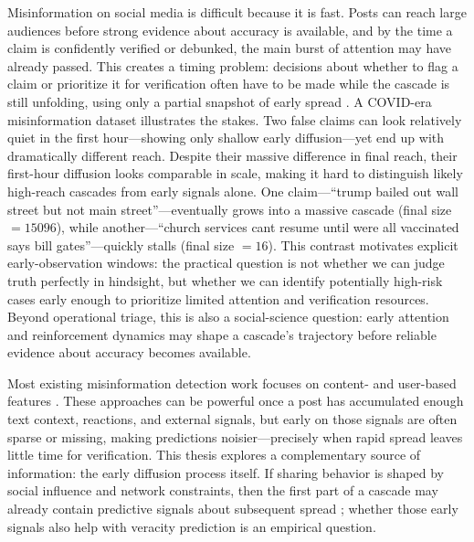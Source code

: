 
Misinformation on social media is difficult because it is fast. Posts can reach large audiences before strong evidence about accuracy is available, and by the time a claim is confidently verified or debunked, the main burst of attention may have already passed. This creates a timing problem: decisions about whether to flag a claim or prioritize it for verification often have to be made while the cascade is still unfolding, using only a partial snapshot of early spread \citep{colbaugh_earlywarning_2012}. A COVID-era misinformation dataset illustrates the stakes. Two false claims can look relatively quiet in the first hour—showing only shallow early diffusion—yet end up with dramatically different reach. Despite their massive difference in final reach, their first-hour diffusion looks comparable in scale, making it hard to distinguish likely high-reach cascades from early signals alone. One claim—“trump bailed out wall street but not main street”—eventually grows into a massive cascade (final size $=15096$), while another—“church services cant resume until were all vaccinated says bill gates”—quickly stalls (final size $=16$). This contrast motivates explicit early-observation windows: the practical question is not whether we can judge truth perfectly in hindsight, but whether we can identify potentially high-risk cases early enough to prioritize limited attention and verification resources. Beyond operational triage, this is also a social-science question: early attention and reinforcement dynamics may shape a cascade's trajectory before reliable evidence about accuracy becomes available. 


Most existing misinformation detection work focuses on content- and user-based features \citep{shu_fake_2017,zubiaga_detection_2018}. These approaches can be powerful once a post has accumulated enough text context, reactions, and external signals, but early on those signals are often sparse or missing, making predictions noisier---precisely when rapid spread leaves little time for verification. This thesis explores a complementary source of information: the early diffusion process itself. If sharing behavior is shaped by social influence and network constraints, then the first part of a cascade may already contain predictive signals about subsequent spread \citep{szabo_predicting_2010,cheng_can_2014}; whether those early signals also help with veracity prediction is an empirical question.

